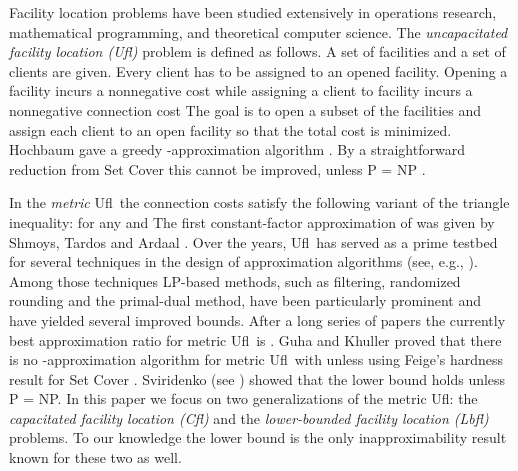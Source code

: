 \documentclass[11pt]{article}\usepackage{amsmath}
\newcommand{\lbfl}{{\sc Lbfl}}
\newcommand{\cfl}{{\sc Cfl}}
\newcommand{\ufl}{{\sc Ufl}}
\begin{document}
Facility location problems have been studied extensively in 
 operations research,
mathematical programming, and theoretical computer science. 
The 
{\em uncapacitated facility location (\ufl)} problem is defined as follows. 
A set  of 
facilities  and a set  of  clients  are given. 
Every client has to be assigned to an opened facility. 
Opening a facility
 incurs a nonnegative cost  while assigning a client  to facility
 incurs a nonnegative connection cost    The goal is to open a subset 
 of the facilities and  assign each
client to an open facility so that  the total cost is minimized. 
Hochbaum gave a greedy  -approximation algorithm
\cite{Hochbaum82}. By a straightforward reduction from Set Cover this
cannot be improved, unless {\sf P = NP} \cite{RazS97}. 

In the {\em metric} \ufl\ 
the connection  costs satisfy the following variant of the triangle inequality:
 for any  and 
The first constant-factor approximation of  was given by Shmoys, 
Tardos and Ardaal \cite{ShmoysTA97}. Over the years,
\ufl\ has served as a prime testbed for several techniques in
the design of approximation algorithms (see, e.g., 
\cite{ShmoysWbook}). Among those techniques LP-based
methods, such as filtering, randomized rounding and the primal-dual method,
 have been particularly prominent and have yielded several improved bounds.
After a long series of papers 
the currently best approximation ratio
for metric \ufl\ is  \cite{Li11}. 
Guha and Khuller \cite{GuhaK99} proved that there is 
no -approximation algorithm for metric \ufl\ with 
 unless  using Feige's hardness result for Set
Cover \cite{Feige98}.
Sviridenko (see \cite{Vygen05}) showed that the lower bound holds
unless {\sf P = NP.}
In this paper we focus on two generalizations of the metric \ufl:  the 
 {\em capacitated facility location (\cfl\/)} and
 the {\em lower-bounded facility location (\lbfl\/)} problems.
To our knowledge  the  lower bound  is the only inapproximability result known
for these two as well. 
\end{document}
